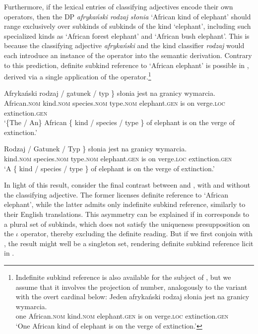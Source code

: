 \documentclass[output=paper,
colorlinks,
citecolor=brown,
newtxmath
]{langscibook}
\begin{document}
\noindent Furthermore, if the lexical entries of classifying adjectives encode their own  operators, then the DP \textit{afrykański rodzaj słonia} `African kind of elephant' should range exclusively over subkinds of subkinds of the kind `elephant', including such specialized kinds as `African forest elephant' and `African bush elephant'. This is because the classifying adjective \textit{afrykański} and the kind classifier \textit{rodzaj} would each introduce an instance of the  operator into the semantic derivation. Contrary to this prediction, definite subkind reference to `African elephant' is possible in , derived via a single application of the  operator.\footnote{Indefinite subkind reference is also available for the subject of , but we assume that it involves the projection of number, analogously to the variant with the overt cardinal below:
\ea
\gll
Jeden afrykański rodzaj słonia jest na granicy wymarcia.\\
one African.\textsc{nom} kind.\textsc{nom} elephant.\textsc{gen} is on verge.\textsc{loc} extinction.\textsc{gen}\\
\glt `One African kind of elephant is on the verge of extinction.'
\z}

\ea \label{ex:attributive_modifier}
\ea \gll
Afrykański \minsp{\{} rodzaj / gatunek / typ \} słonia jest na granicy wymarcia.\\
African.\textsc{nom} {} kind.\textsc{nom} { } species.\textsc{nom} { } type.\textsc{nom} { } elephant.\textsc{gen} is on verge.\textsc{loc} extinction.\textsc{gen}\\
\glt `\{The / An\} African \{ kind / species / type \} of elephant is on the verge of extinction.'
\label{ex:attributive_modifier_1}

\ex \gll
\minsp{\{} Rodzaj / Gatunek / Typ \} słonia jest na granicy wymarcia.\\
{} kind.\textsc{nom} { } species.\textsc{nom} { } type.\textsc{nom} { } elephant.\textsc{gen} is on verge.\textsc{loc} extinction.\textsc{gen}\\
\glt `A \{ kind / species / type \} of elephant is on the verge of extinction.'
\label{ex:attributive_modifier_2}
\z \z

\noindent
In light of this result, consider the final contrast between  and , with and without the classifying adjective. The former licenses definite reference to `African elephant', while the latter admits only indefinite subkind reference, similarly to their English translations. This asymmetry can be explained if  in  corresponds to a plural set of subkinds, which does not satisfy the uniqueness presupposition on the $\iota$ operator, thereby excluding the definite reading. But if we first conjoin  with , the result might well be a singleton set, rendering definite subkind reference licit in .
\end{document}
